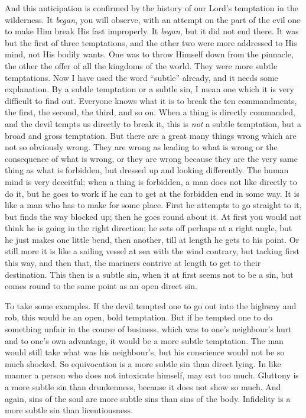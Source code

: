 And this anticipation is confirmed by the history
of our Lord's temptation in the wilderness. It \emph{began}, you will observe, with an attempt on the part of the evil one to make Him
break His fast improperly. It \emph{began}, but it did not end there.
It was but the first of three temptations, and the other two were more
addressed to His mind, not His bodily wants. One was to throw Himself
down from the pinnacle, the other the offer of all the kingdoms of the
world. They were more subtle temptations. Now I have used the word ``subtle''
already, and it needs some explanation. By a subtle temptation or a
subtle sin, I mean one which it is very difficult to find out.
Everyone knows what it is to break the ten commandments, the first,
the second, the third, and so on. When a thing is directly commanded,
and the devil tempts us directly to break it, this is \emph{not} a
subtle temptation, but a broad and gross temptation. But there are a
great many things wrong which are not so obviously wrong. They are
wrong as leading to what is wrong or the consequence of what is wrong,
or they are wrong because they are the very same thing as what is
forbidden, but dressed up and looking differently. The human mind is
very deceitful; when a thing is forbidden, a man does not like
directly to do it, but he goes to work if he can to get at the
forbidden end in some way. It is like a man who has to make for some
place. First he attempts to go straight to it, but finds the way
blocked up; then he goes round about it. At first you would not think
he is going in the right direction; he sets off perhaps at a right
angle, but he just makes one little bend, then another, till at
length he gets to his point. Or still more it is like a sailing vessel
at sea with the wind contrary, but tacking first this way, and then
that, the mariners contrive at length to get to their destination.
This then is a subtle sin, when it at first seems not to be a sin, but
comes round to the same point as an open direct sin.

To take some examples. If the devil tempted one
to go out into the highway and rob, this would be an open, bold
temptation. But if he tempted one to do something unfair in the course
of business, which was to one's neighbour's hurt and to one's own
advantage, it would be a more subtle temptation. The man would still
take what was his neighbour's, but his conscience would not be so much
shocked. So equivocation is a more subtle sin than direct lying. In
like manner a person who does not intoxicate himself, may eat too
much. Gluttony is a more subtle sin than drunkenness, because it does
not show so much. And again, sins of the soul are more subtle sins
than sins of the body. Infidelity is a more subtle sin than
licentiousness.

